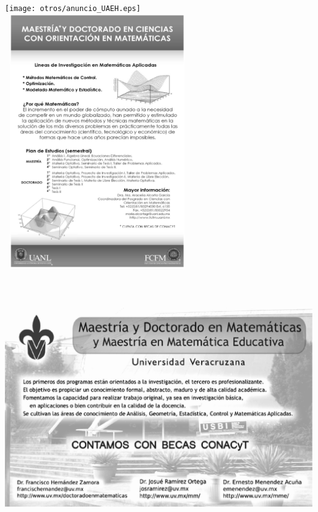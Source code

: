 \newpage
\thispagestyle{empty}


\texttt{[image: otros/anuncio\_UAEH.eps]}
\hspace{1cm}
\includegraphics[width=8cm,height=11cm]{otros/POSTER-UANL.eps}
\begin{center}
\includegraphics[width=15cm,height=11cm]{otros/uv.eps}
\end{center}
